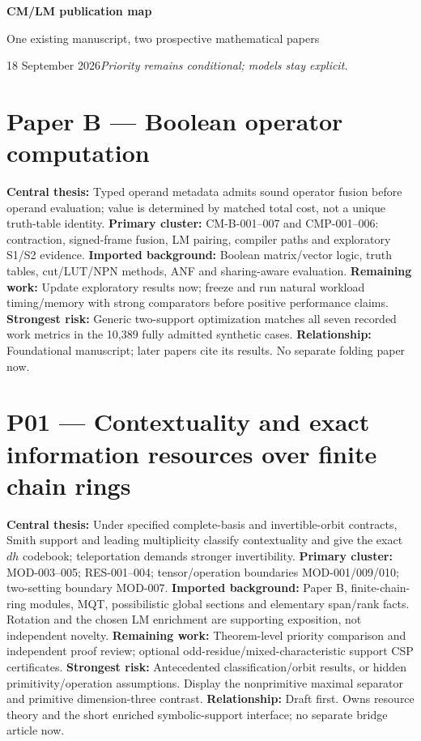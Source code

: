 \documentclass[10pt]{article}
\begin{document}
\begin{center}
{\LARGE\bfseries CM/LM publication map}\par\medskip
{\large One existing manuscript, two prospective mathematical papers}\par
18 September 2026\quad\textit{Priority remains conditional; models stay explicit.}
\end{center}

\section*{Paper B --- Boolean operator computation}
\textbf{Central thesis:} Typed operand metadata admits sound operator fusion
before operand evaluation; value is determined by matched total cost, not a
unique truth-table identity.
\textbf{Primary cluster:} CM-B-001--007 and CMP-001--006: contraction,
signed-frame fusion, LM pairing, compiler paths and exploratory S1/S2 evidence.
\textbf{Imported background:} Boolean matrix/vector logic, truth tables,
cut/LUT/NPN methods, ANF and sharing-aware evaluation.
\textbf{Remaining work:} Update exploratory results now; freeze and run natural
workload timing/memory with strong comparators before positive performance
claims.
\textbf{Strongest risk:} Generic two-support optimization matches all seven
recorded work metrics in the 10,389 fully admitted synthetic cases.
\textbf{Relationship:} Foundational manuscript; later papers cite its results.
No separate folding paper now.

\section*{P01 --- Contextuality and exact information resources over finite chain rings}
\textbf{Central thesis:} Under specified complete-basis and invertible-orbit
contracts, Smith support and leading multiplicity classify contextuality and
give the exact $dh$ codebook; teleportation demands stronger invertibility.
\textbf{Primary cluster:} MOD-003--005; RES-001--004; tensor/operation boundaries
MOD-001/009/010; two-setting boundary MOD-007.
\textbf{Imported background:} Paper B, finite-chain-ring modules, MQT,
possibilistic global sections and elementary span/rank facts. Rotation and the
chosen LM enrichment are supporting exposition, not independent novelty.
\textbf{Remaining work:} Theorem-level priority comparison and independent proof
review; optional odd-residue/mixed-characteristic support CSP certificates.
\textbf{Strongest risk:} Antecedented classification/orbit results, or hidden
primitivity/operation assumptions. Display the nonprimitive maximal separator
and primitive dimension-three contrast.
\textbf{Relationship:} Draft first. Owns resource theory and the short enriched
symbolic-support interface; no separate bridge article now.
\end{document}
